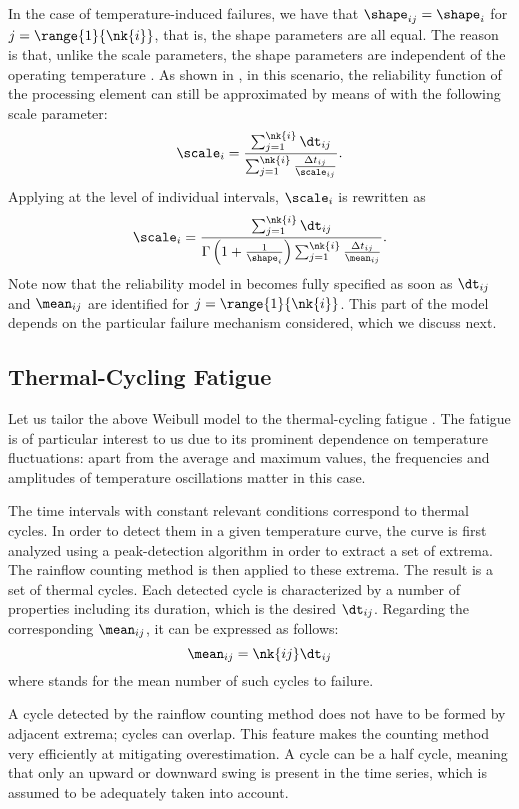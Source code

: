 In the case of temperature-induced failures, we have that $\shape_{ij} =
\shape_i$ for $j = \range{1}{\nk{i}}$, that is, the shape parameters are all
equal. The reason is that, unlike the scale parameters, the shape parameters are
independent of the operating temperature \cite{chang2006}. As shown in
\cite{xiang2010}, in this scenario, the reliability function of the processing
element can still be approximated by means of  with
the following scale parameter:
\[
  \scale_i = \frac{\sum_{j = 1}^{\nk{i}} \dt_{ij}}{\sum_{j = 1}^{\nk{i}} \frac{\Delta t_{ij}}{\scale_{ij}}}.
\]
Applying  at the level of individual intervals,
$\scale_i$ is rewritten as
\[
  \scale_i = \frac{\sum_{j = 1}^{\nk{i}} \dt_{ij}}{\Gamma\left(1 + \frac{1}{\shape_i}\right) \sum_{j = 1}^{\nk{i}} \frac{\Delta t_{ij}}{\mean_{ij}}}.
\]
Note now that the reliability model in  becomes fully
specified as soon as $\dt_{ij}$ and $\mean_{ij}$ are identified for $j =
\range{1}{\nk{i}}$. This part of the model depends on the particular failure
mechanism considered, which we discuss next.

\subsection{Thermal-Cycling Fatigue}

Let us tailor the above Weibull model to the thermal-cycling fatigue
\cite{jedec2016}. The fatigue is of particular interest to us due to its
prominent dependence on temperature fluctuations: apart from the average and
maximum values, the frequencies and amplitudes of temperature oscillations
matter in this case.

The time intervals with constant relevant conditions correspond to thermal
cycles. In order to detect them in a given temperature curve, the curve is first
analyzed using a peak-detection algorithm in order to extract a set of extrema.
The rainflow counting method \cite{xiang2010} is then applied to these extrema.
The result is a set of  thermal cycles. Each detected cycle is
characterized by a number of properties including its duration, which is the
desired $\dt_{ij}$. Regarding the corresponding $\mean_{ij}$, it can be
expressed as follows:
\[
  \mean_{ij} = \nk{ij} \dt_{ij}
\]
where  stands for the mean number of such cycles to failure.

\begin{remark}
A cycle detected by the rainflow counting method does not have to be formed by
adjacent extrema; cycles can overlap. This feature makes the counting method
very efficiently at mitigating overestimation. A cycle can be a half cycle,
meaning that only an upward or downward swing is present in the time series,
which is assumed to be adequately taken into account.
\end{remark}

